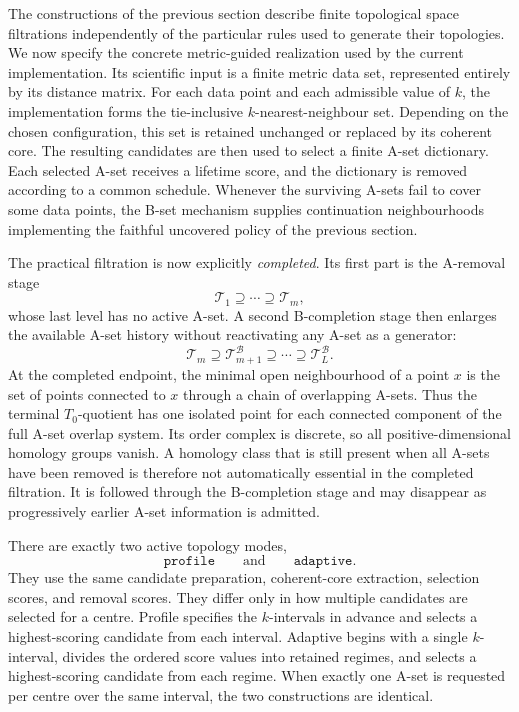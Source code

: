 \documentclass[a4paper,11pt]{article}
\theoremstyle{definition}
\theoremstyle{remark}
\begin{document}
The constructions of the previous section describe finite topological space filtrations independently of the particular rules used to generate their topologies. We now specify the concrete metric-guided realization used by the current implementation. Its scientific input is a finite metric data set, represented entirely by its distance matrix. For each data point and each admissible value of $k$, the implementation forms the tie-inclusive $k$-nearest-neighbour set. Depending on the chosen configuration, this set is retained unchanged or replaced by its coherent core. The resulting candidates are then used to select a finite A-set dictionary. Each selected A-set receives a lifetime score, and the dictionary is removed according to a common schedule. Whenever the surviving A-sets fail to cover some data points, the B-set mechanism supplies continuation neighbourhoods implementing the faithful uncovered policy of the previous section.

The practical filtration is now explicitly \emph{completed}. Its first part is the A-removal stage
$$
\mathcal T_1\supseteq\cdots\supseteq\mathcal T_m,
$$
whose last level has no active A-set. A second B-completion stage then enlarges the available A-set history without reactivating any A-set as a generator:
$$
\mathcal T_m \supseteq \mathcal T_{m+1}^{\mathcal{B}} \supseteq\cdots\supseteq \mathcal T_L^{\mathcal{B}}.
$$
At the completed endpoint, the minimal open neighbourhood of a point $x$ is the set of points connected to $x$ through a chain of overlapping A-sets. Thus the terminal $T_0$-quotient has one isolated point for each connected component of the full A-set overlap system. Its order complex is discrete, so all positive-dimensional homology groups vanish. A homology class that is still present when all A-sets have been removed is therefore not automatically essential in the completed filtration. It is followed through the B-completion stage and may disappear as progressively earlier A-set information is admitted.

There are exactly two active topology modes,
$$
\boxed{\texttt{profile}\qquad\text{and}\qquad\texttt{adaptive}.}
$$
They use the same candidate preparation, coherent-core extraction, selection scores, and removal scores. They differ only in how multiple candidates are selected for a centre. Profile specifies the $k$-intervals in advance and selects a highest-scoring candidate from each interval. Adaptive begins with a single $k$-interval, divides the ordered score values into retained regimes, and selects a highest-scoring candidate from each regime. When exactly one A-set is requested per centre over the same interval, the two constructions are identical.
\end{document}
